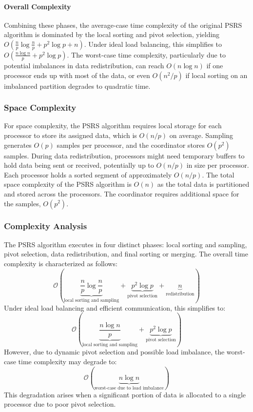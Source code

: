 \documentclass[]{interact}
\theoremstyle{plain}
\theoremstyle{definition}
\theoremstyle{remark}
\begin{document}
\paragraph{Overall Complexity} Combining these phases, the average-case time complexity of the original PSRS algorithm is dominated by the local sorting and pivot selection, yielding $O\left(\frac{n}{p} \log \frac{n}{p} + p^2 \log p + n\right)$. Under ideal load balancing, this simplifies to $O\left(\frac{n \log n}{p} + p^2 \log p\right)$. The worst-case time complexity, particularly due to potential imbalances in data redistribution, can reach $O(n \log n)$ if one processor ends up with most of the data, or even $O(n^2/p)$ if local sorting on an imbalanced partition degrades to quadratic time.

\subsubsection{Space Complexity}
For space complexity, the PSRS algorithm requires local storage for each processor to store its assigned data, which is $O(n/p)$ on average. Sampling generates $O(p)$ samples per processor, and the coordinator stores $O(p^2)$ samples. During data redistribution, processors might need temporary buffers to hold data being sent or received, potentially up to $O(n/p)$ in size per processor. Each processor holds a sorted segment of approximately $O(n/p)$. The total space complexity of the PSRS algorithm is $O(n)$ as the total data is partitioned and stored across the processors. The coordinator requires additional space for the samples, $O(p^2)$.


\subsubsection{Complexity Analysis}
The PSRS algorithm executes in four distinct phases: local sorting and sampling, pivot selection, data redistribution, and final sorting or merging. The overall time complexity is characterized as follows:
\begin{equation}
    \mathcal{O}\left( \underbrace{\frac{n}{p} \log \frac{n}{p}}_{\text{local sorting and sampling}} + \underbrace{p^2 \log p}_{\text{pivot selection}} + \underbrace{n}_{\text{redistribution}} \right)
\end{equation}
Under ideal load balancing and efficient communication, this simplifies to:
\begin{equation}
    \mathcal{O}\left( \underbrace{\frac{n \log n}{p}}_{\text{local sorting and sampling}} + \underbrace{p^2 \log p}_{\text{pivot selection}} \right)
\end{equation}
However, due to dynamic pivot selection and possible load imbalance, the worst-case time complexity may degrade to:
\begin{equation}
    \mathcal{O}\left( \underbrace{n \log n}_{\text{worst-case due to load imbalance}} \right)
\end{equation}
This degradation arises when a significant portion of data is allocated to a single processor due to poor pivot selection.
\end{document}
